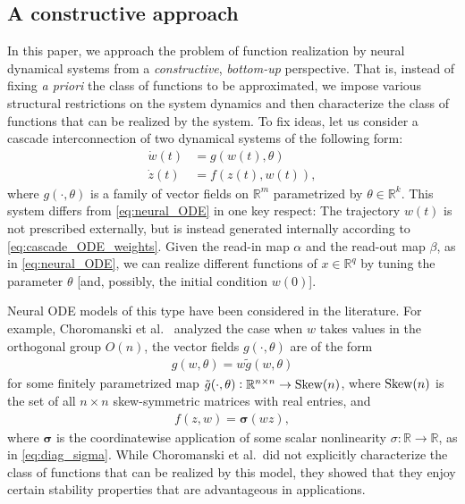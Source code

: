 \documentclass[letterpaper, 10pt, conference]{ieeeconf}
\def\Reals{{\mathbb R}}
\begin{document}
\subsection{A constructive approach}

In this paper, we approach the problem of function realization by neural dynamical systems from a \textit{constructive}, \textit{bottom-up} perspective. That is, instead of fixing \textit{a priori} the class of functions to be approximated, we impose various structural restrictions on the system dynamics and then characterize the class of functions that can be realized by the system. To fix ideas, let us consider a cascade interconnection \cite{Krener_decomposition} of two dynamical systems of the following form: 
\begin{subequations}\label{eq:cascade_ODE}
\begin{align}
	\dot{w}(t) &= g(w(t),\theta) \label{eq:cascade_ODE_weights}\\
	\dot{z}(t) &= f(z(t),w(t)), \label{eq:cascade_ODE_activations}
\end{align}
\end{subequations}
where $g(\cdot,\theta)$ is a family of vector fields on $\Reals^m$ parametrized by $\theta \in \Reals^k$. This system differs from \eqref{eq:neural_ODE} in one key respect: The trajectory $w(t)$ is not prescribed externally, but is instead generated internally according to \eqref{eq:cascade_ODE_weights}. Given the read-in map $\alpha$ and the read-out map $\beta$, as in \eqref{eq:neural_ODE}, we can realize different functions of $x \in \Reals^q$ by tuning the parameter $\theta$ [and, possibly, the initial condition $w(0)$]. 

Neural ODE models of this type have been considered in the literature. For example, Choromanski et al.~\cite{ODEtoODE} analyzed the case when $w$ takes values in the orthogonal group $O(n)$, the vector fields $g(\cdot,\theta)$ are of the form
\begin{align*}
	g(w,\theta) = w\tilde{g}(w,\theta)
\end{align*}
for some finitely parametrized map $\tilde{g}(\cdot,\theta) : \Reals^{n \times n} \to {\rm Skew}(n)$, where ${\rm Skew}(n)$ is the set of all $n \times n$ skew-symmetric matrices with real entries, and 
\begin{align*}
	f(z,w) = \boldsymbol{\sigma}(wz),
\end{align*}
where $\boldsymbol{\sigma}$ is the coordinatewise application of some scalar nonlinearity $\sigma : \Reals \to \Reals$, as in \eqref{eq:diag_sigma}. While Choromanski et al.\ did not explicitly characterize the class of functions that can be realized by this model, they showed that they enjoy certain stability properties that are advantageous in applications.
\end{document}
